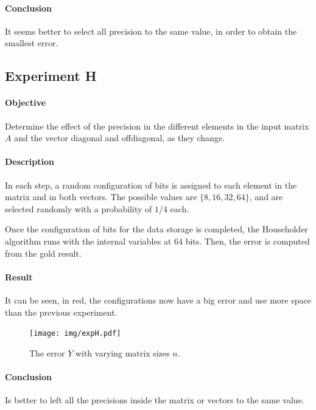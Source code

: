 \documentclass[11pt,a4paper]{article}
\begin{document}
\paragraph{Conclusion}
It seems better to select all precision to the same value, in order to obtain 
the smallest error.


\newpage
\subsection*{Experiment H}

\paragraph{Objective}
Determine the effect of the precision in the different elements in the input 
matrix $A$ and the vector diagonal and offdiagonal, as they change.

\paragraph{Description}
In each step, a random configuration of bits is assigned to each element in the 
matrix and in both vectors. The possible values are $\{8,16,32,64\}$, and are 
selected randomly with a probability of $1/4$ each.

Once the configuration of bits for the data storage is completed, the 
Householder algorithm runs with the internal variables at 64 bits. Then, the 
error is computed from the gold result.

\paragraph{Result}
It can be seen, in red, the configurations now have a big error and use more 
space than the previous experiment.

\begin{figure}[h]
	\centering
	\texttt{[image: img/expH.pdf]}
	\caption{The error $\overline Y$ with varying matrix sizes $n$.}
	\label{fig:expG}
\end{figure}

\paragraph{Conclusion}
Is better to left all the precisions inside the matrix or vectors to the same 
value.
\end{document}

